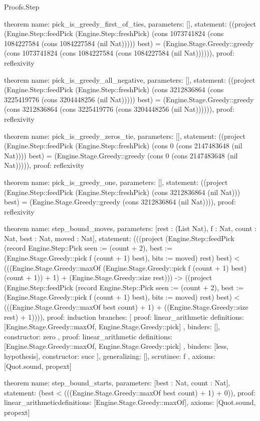 \begin{lexlean}{Proofs.Step}
\begin{semanticmodule}
theorem{
  name: pick_is_greedy_first_of_ties,
  parameters: [],
  statement: ((project (Engine.Step::feedPick (Engine.Step::freshPick) (cons 1073741824 (cons 1084227584 (cons 1084227584 (nil Nat))))) best) = (Engine.Stage.Greedy::greedy (cons 1073741824 (cons 1084227584 (cons 1084227584 (nil Nat)))))),
  proof: reflexivity{}
}

theorem{
  name: pick_is_greedy_all_negative,
  parameters: [],
  statement: ((project (Engine.Step::feedPick (Engine.Step::freshPick) (cons 3212836864 (cons 3225419776 (cons 3204448256 (nil Nat))))) best) = (Engine.Stage.Greedy::greedy (cons 3212836864 (cons 3225419776 (cons 3204448256 (nil Nat)))))),
  proof: reflexivity{}
}

theorem{
  name: pick_is_greedy_zeros_tie,
  parameters: [],
  statement: ((project (Engine.Step::feedPick (Engine.Step::freshPick) (cons 0 (cons 2147483648 (nil Nat)))) best) = (Engine.Stage.Greedy::greedy (cons 0 (cons 2147483648 (nil Nat))))),
  proof: reflexivity{}
}

theorem{
  name: pick_is_greedy_one,
  parameters: [],
  statement: ((project (Engine.Step::feedPick (Engine.Step::freshPick) (cons 3212836864 (nil Nat))) best) = (Engine.Stage.Greedy::greedy (cons 3212836864 (nil Nat)))),
  proof: reflexivity{}
}

theorem{
  name: step_bound_moves,
  parameters: [rest : (List Nat), f : Nat, count : Nat, best : Nat, moved : Nat],
  statement: (((project (Engine.Step::feedPick (record Engine.Step::Pick {seen := (count + 2), best := (Engine.Stage.Greedy::pick f (count + 1) best), bits := moved}) rest) best) < (((Engine.Stage.Greedy::maxOf (Engine.Stage.Greedy::pick f (count + 1) best) (count + 1)) + 1) + (Engine.Stage.Greedy::size rest))) -> ((project (Engine.Step::feedPick (record Engine.Step::Pick {seen := (count + 2), best := (Engine.Stage.Greedy::pick f (count + 1) best), bits := moved}) rest) best) < (((Engine.Stage.Greedy::maxOf best count) + 1) + ((Engine.Stage.Greedy::size rest) + 1)))),
  proof: induction{
    branches: [
      {
        proof: linear_arithmetic{
          definitions: [Engine.Stage.Greedy::maxOf, Engine.Stage.Greedy::pick]
        },
        binders: [],
        constructor: zero
      },
      {
        proof: linear_arithmetic{
          definitions: [Engine.Stage.Greedy::maxOf, Engine.Stage.Greedy::pick]
        },
        binders: [less, hypothesis],
        constructor: succ
      }
    ],
    generalizing: [],
    scrutinee: f
  },
  axioms: [Quot.sound, propext]
}

theorem{
  name: step_bound_starts,
  parameters: [best : Nat, count : Nat],
  statement: (best < (((Engine.Stage.Greedy::maxOf best count) + 1) + 0)),
  proof: linear_arithmetic{definitions: [Engine.Stage.Greedy::maxOf]},
  axioms: [Quot.sound, propext]
}


\end{semanticmodule}
\end{lexlean}

